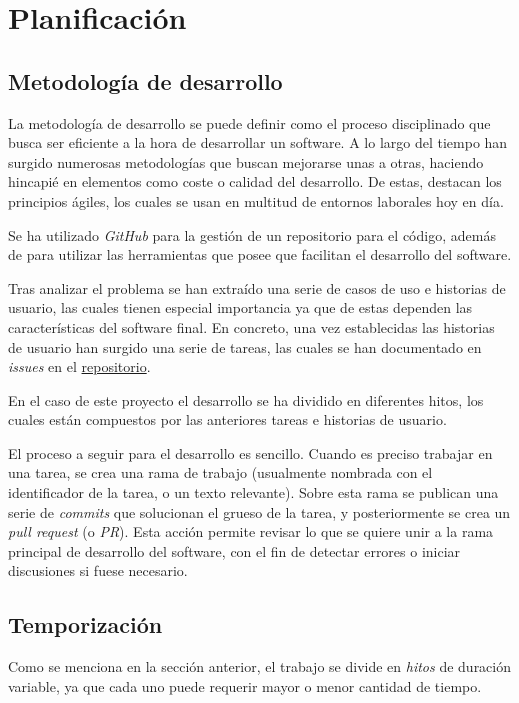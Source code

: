 \chapter{Planificación}

\section{Metodología de desarrollo}

La metodología de desarrollo se puede definir como el proceso disciplinado que busca ser eficiente a la hora de desarrollar un software. A lo largo del tiempo han surgido numerosas metodologías que buscan mejorarse unas a otras, haciendo hincapié en elementos como coste o calidad del desarrollo. De estas, destacan los principios ágiles, los cuales se usan en multitud de entornos laborales hoy en día.

Se ha utilizado \textit{GitHub} para la gestión de un repositorio para el código, además de para utilizar las herramientas que posee que facilitan el desarrollo del software.

Tras analizar el problema se han extraído una serie de casos de uso e historias de usuario, las cuales tienen especial importancia ya que de estas dependen las características del software final. En concreto, una vez establecidas las historias de usuario han surgido una serie de tareas, las cuales se han documentado en \textit{issues} en el \href{https://github.com/harvestcore/matroos}{repositorio}.

En el caso de este proyecto el desarrollo se ha dividido en diferentes hitos, los cuales están compuestos por las anteriores tareas e historias de usuario.

El proceso a seguir para el desarrollo es sencillo. Cuando es preciso trabajar en una tarea, se crea una rama de trabajo (usualmente nombrada con el identificador de la tarea, o un texto relevante). Sobre esta rama se publican una serie de \textit{commits} que solucionan el grueso de la tarea, y posteriormente se crea un \textit{pull request} (o \textit{PR}). Esta acción permite revisar lo que se quiere unir a la rama principal de desarrollo del software, con el fin de detectar errores o iniciar discusiones si fuese necesario.

\section{Temporización}

Como se menciona en la sección anterior, el trabajo se divide en \textit{hitos} de duración variable, ya que cada uno puede requerir mayor o menor cantidad de tiempo.

